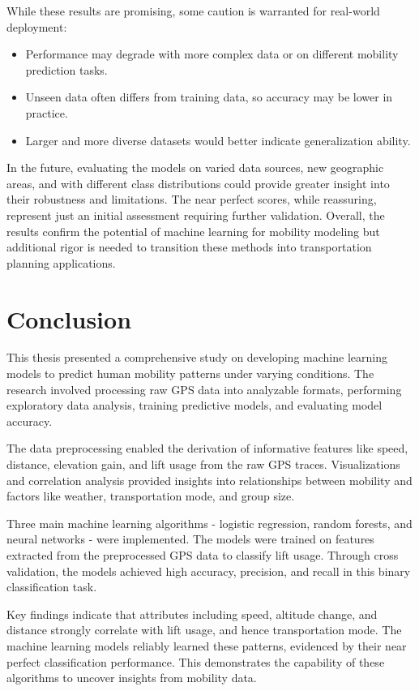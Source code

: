 While these results are promising, some caution is warranted for real-world deployment:
\begin{itemize}
	\item Performance may degrade with more complex data or on different mobility prediction tasks.
	\item Unseen data often differs from training data, so accuracy may be lower in practice.
	\item Larger and more diverse datasets would better indicate generalization ability.
\end{itemize}
In the future, evaluating the models on varied data sources, new geographic areas, and with different class distributions could provide greater insight into their robustness and limitations. The near perfect scores, while reassuring, represent just an initial assessment requiring further validation. Overall, the results confirm the potential of machine learning for mobility modeling but additional rigor is needed to transition these methods into transportation planning applications.



\section{Conclusion}
\label{sec:results:conclusion}

This thesis presented a comprehensive study on developing machine learning models to predict human mobility patterns under varying conditions. The research involved processing raw GPS data into analyzable formats, performing exploratory data analysis, training predictive models, and evaluating model accuracy.

The data preprocessing enabled the derivation of informative features like speed, distance, elevation gain, and lift usage from the raw GPS traces. Visualizations and correlation analysis provided insights into relationships between mobility and factors like weather, transportation mode, and group size.

Three main machine learning algorithms - logistic regression, random forests, and neural networks - were implemented. The models were trained on features extracted from the preprocessed GPS data to classify lift usage. Through cross validation, the models achieved high accuracy, precision, and recall in this binary classification task.

Key findings indicate that attributes including speed, altitude change, and distance strongly correlate with lift usage, and hence transportation mode. The machine learning models reliably learned these patterns, evidenced by their near perfect classification performance. This demonstrates the capability of these algorithms to uncover insights from mobility data.


